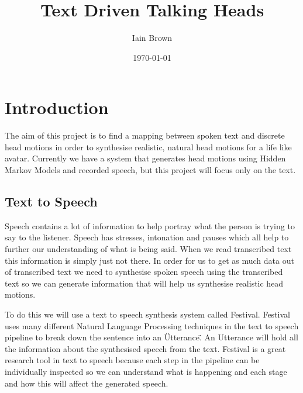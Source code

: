 \documentclass[bsc,frontabs,twoside,singlespacing,parskip]{infthesis}
\begin{document}
\title{Text Driven Talking Heads}

\author{Iain Brown}

\date{\today}
\maketitle
\tableofcontents

\chapter{Introduction}
The aim of this project is to find a mapping between spoken text and discrete head motions in order to synthesise realistic, natural head motions for a life like avatar. Currently we have a system that generates head motions using Hidden Markov Models and recorded speech, but this project will focus only on the text.
\section{Text to Speech}
Speech contains a lot of information to help portray what the person is trying to say to the listener. Speech has stresses, intonation and pauses which all help to further our understanding of what is being said. When we read transcribed text this information is simply just not there. In order for us to get as much data out of transcribed text we need to synthesise spoken speech using the transcribed text so we can generate information that will help us synthesise realistic head motions.

To do this we will use a text to speech synthesis system called Festival. Festival uses many different Natural Language Processing techniques in the text to speech pipeline to break down the sentence into an \"Utterance\". An Utterance will hold all the information about the synthesised speech from the text. Festival is a great research tool in text to speech because each step in the pipeline can be individually inspected so we can understand what is happening and each stage and how this will affect the generated speech.
\end{document}
